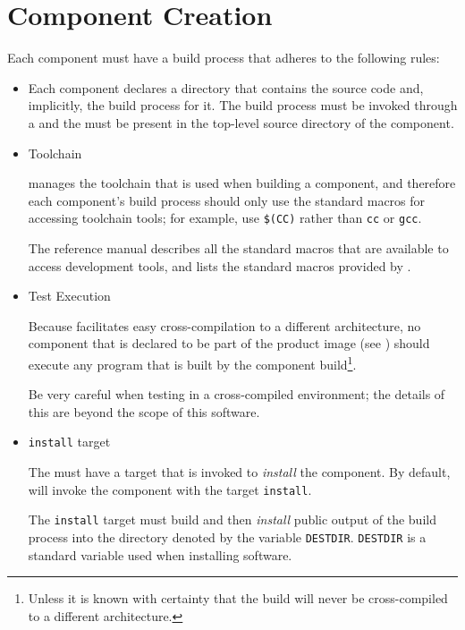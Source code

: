 \section{Component \makefile Creation}\label{wrap:component-makefile}

Each component must have a build process that adheres to the following
rules:

\begin{itemize}
\item \makefile

  Each component declares a directory that contains the source code
  and, implicitly, the build process for it.  The build process must
  be invoked through a \makefile and the \makefile must be present in
  the top-level source directory of the component.

\item Toolchain

  \lmsbw manages the toolchain that is used when building a component,
  and therefore each component's build process should only use the
  standard macros for accessing toolchain tools; for example, use
  \texttt{\$(CC)} rather than \texttt{cc} or \texttt{gcc}.

  The \gnumake reference manual describes all the standard macros that
  are available to access development tools, and
   lists the standard macros provided
  by \lmsbw.

\item Test Execution

  Because \lmsbw facilitates easy cross-compilation to a different
  architecture, no component that is declared to be part of the
  product image (see ) should execute any
  program that is built by the component build\footnote{Unless it is
    known with certainty that the build will never be cross-compiled
    to a different architecture.}.

  Be very careful when testing in a cross-compiled environment; the
  details of this are beyond the scope of this software.

\item \texttt{install} target

  The \makefile must have a target that is invoked to \emph{install}
  the component.  By default, \lmsbw will invoke the component
  \makefile with the target \texttt{install}.

  The \texttt{install} target must build and then \emph{install}
  public output of the build process into the directory denoted by the
  \makefile variable \texttt{DESTDIR}.  \texttt{DESTDIR} is a standard
  \make variable used when installing software.


\end{itemize}

